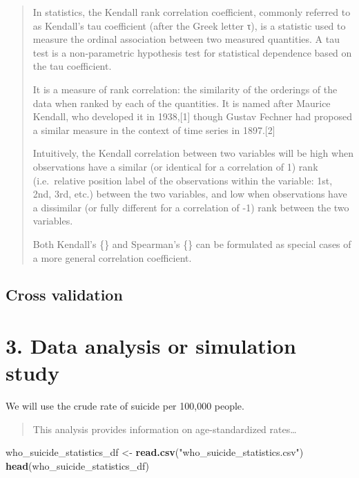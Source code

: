 \documentclass[]{article}
\newenvironment{Shaded}{\begin{snugshade}}{\end{snugshade}}
\newcommand{\KeywordTok}[1]{\textcolor[rgb]{0.13,0.29,0.53}{\textbf{#1}}}
\newcommand{\NormalTok}[1]{#1}
\newcommand{\StringTok}[1]{\textcolor[rgb]{0.31,0.60,0.02}{#1}}
\begin{document}
\begin{quote}
In statistics, the Kendall rank correlation coefficient, commonly
referred to as Kendall's tau coefficient (after the Greek letter τ), is
a statistic used to measure the ordinal association between two measured
quantities. A tau test is a non-parametric hypothesis test for
statistical dependence based on the tau coefficient.

It is a measure of rank correlation: the similarity of the orderings of
the data when ranked by each of the quantities. It is named after
Maurice Kendall, who developed it in 1938,{[}1{]} though Gustav Fechner
had proposed a similar measure in the context of time series in
1897.{[}2{]}

Intuitively, the Kendall correlation between two variables will be high
when observations have a similar (or identical for a correlation of 1)
rank (i.e.~relative position label of the observations within the
variable: 1st, 2nd, 3rd, etc.) between the two variables, and low when
observations have a dissimilar (or fully different for a correlation of
-1) rank between the two variables.

Both Kendall's \{\displaystyle \tau \} \tau  and Spearman's
\{\displaystyle \rho \} \rho  can be formulated as special cases of a
more general correlation coefficient.
\end{quote}

\hypertarget{cross-validation}{%
\subsection{Cross validation}\label{cross-validation}}

\hypertarget{data-analysis-or-simulation-study}{%
\section{3. Data analysis or simulation
study}\label{data-analysis-or-simulation-study}}

We will use the crude rate of suicide per 100,000 people.

\begin{quote}
This analysis provides information on age-standardized rates\ldots{}
\end{quote}

\begin{Shaded}
\begin{Highlighting}[]
\NormalTok{who_suicide_statistics_df <-}\StringTok{ }\KeywordTok{read.csv}\NormalTok{(}\StringTok{"who_suicide_statistics.csv"}\NormalTok{)}
\KeywordTok{head}\NormalTok{(who_suicide_statistics_df)}
\end{Highlighting}
\end{Shaded}
\end{document}

